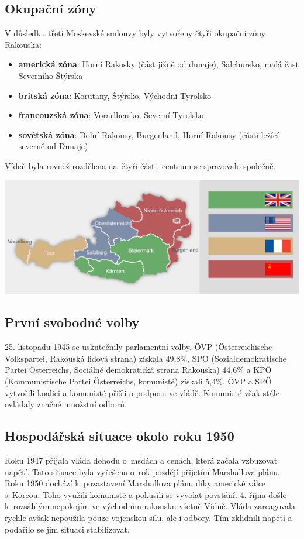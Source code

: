 \documentclass[a2 paper]{article}
\begin{document}
\begin{landscape}
\begin{minipage}[c]{\linewidth}
\begin{minipage}[t]{0.5\linewidth}
	\subsection*{Okupační zóny}
	V důsledku třetí Moskevské smlouvy byly vytvořeny čtyři okupační zóny Rakouska:
	\begin{itemize}
		\item \textbf{americká zóna}: Horní Rakosky (část jižně od dunaje), Salcbursko, malá čast Severního Štýrska
		\item \textbf{britská zóna}: Korutany, Štýrsko, Východní Tyrolsko
		\item \textbf{francouzská zóna}: Vorarlbersko, Severní Tyrolsko
		\item \textbf{sovětská zóna}: Dolní Rakousy, Burgenland, Horní Rakousy (části ležící severně od Dunaje)
	\end{itemize}
	Vídeň byla rovněž rozdělena na~čtyři části, centrum se spravovalo společně. 

	\begin{minipage}[t]{\linewidth}


\includegraphics[width=\linewidth]{images/okupacniZony.png}

\end{minipage}
	\subsection*{První svobodné volby}
	25. listopadu 1945 se uskutečnily parlamentní volby. ÖVP (Österreichische Volkspartei, Rakouská lidová strana) získala 49,8\%, SPÖ (Sozialdemokratische Partei Österreichs, Sociálně demokratická strana Rakouska) 44,6\% a KPÖ (Kommunistische Partei Österreichs, komunisté) získali 5,4\%. ÖVP a SPÖ vytvořili koalici a komunisté přišli o podporu ve vládě. Komunisté však stále ovládaly značné množstní odborů.
	\subsection*{Hospodářská situace okolo roku 1950}
	Roku 1947 přijala vláda dohodu o~msdách a cenách, která začala vzbuzovat napětí. Tato situace byla vyřešena o~rok pozdějí přijetím Marshallova plánu. Roku 1950 dochází k~pozastavení Marshallova plánu díky americké válce s~Koreou. Toho využili komunisté a pokusili se vyvolat povstání. 4. října došlo k~rozsáhlým nepokojím ve východním rakousku všetně Vídně. Vláda zareagovala rychle avšak nepoužila pouze vojenskou sílu, ale i odbory. Tím zklidnili napětí a podařilo se jim situaci stabilizovat.

\end{minipage}
\end{minipage}
\end{landscape}
\end{document}
